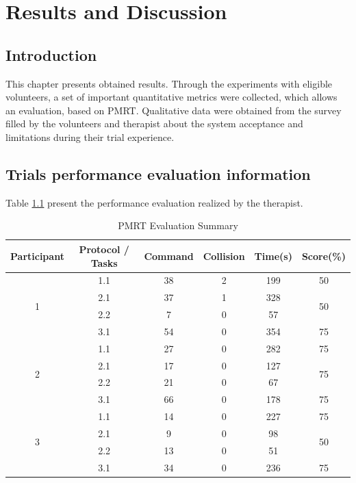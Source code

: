 \chapter{Results and Discussion}

\section{Introduction} 

This chapter presents obtained results. Through the experiments with eligible volunteers, a set of important quantitative metrics were collected, which allows an evaluation, based on PMRT. Qualitative data were obtained from the survey filled by the volunteers and therapist about the system acceptance and limitations during their trial experience.

\section{Trials performance evaluation information}

Table \ref{tb:ResultsPMRT} present the performance evaluation realized by the therapist.

\begin{table}[!htbt]
\caption{PMRT Evaluation Summary} \label{tb:ResultsPMRT}
\centering
\begin{tabular}{cccccc}
\toprule
Participant & Protocol / Tasks & Command & Collision & Time(s) & Score(\%) \\ \midrule
\multirow{4}{*}{1} & 1.1   & 38 & 2 & 199 & 50 \\
                            			     & 2.1 & 37 & 1 & 328 & \multirow{2}{*}{50}\\
                            			     & 2.2 &  7 & 0 & 57  & \\
						     & 3.1   & 54 & 0 & 354 & 75 \\ \midrule
\multirow{4}{*}{2} & 1.1   & 27 & 0 & 282 & 75 \\
                            			     & 2.1 & 17 & 0 & 127 & \multirow{2}{*}{75}\\
                            			     & 2.2 & 21 & 0 & 67  & \\
						     & 3.1   & 66 & 0 & 178 & 75 \\ \midrule
\multirow{4}{*}{3} & 1.1   & 14 & 0 & 227 & 75 \\
                            			     & 2.1 & 9  & 0 & 98 & \multirow{2}{*}{50}\\
                            			     & 2.2 & 13 & 0 & 51  & \\
						     & 3.1   & 34 & 0 & 236 & 75 \\ 
\bottomrule
\end{tabular}
\end{table}


